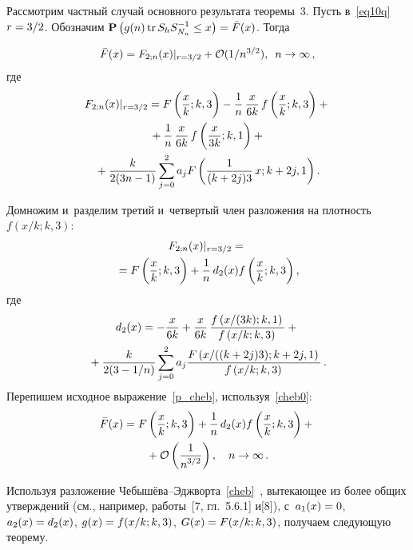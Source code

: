 \begin{multicols}{2}
Рассмотрим частный случай основного результата теоремы~3. Пусть в~\eqref{eq10q} 
$r\hm=3/2$. Обозначим $\mathbf{P}\left( g(n) \,\textrm{tr}\,S_h S^{-1}_{N_n} \leq x\right)
\hm = \bar{F}(x)$. Тогда

\noindent
\begin{equation}
\label{p_cheb}
\bar{F}(x) = F_{2; n}(x)|_{r=3/2} + \mathcal{O}(1/n^{3/2}), \enskip n \to \infty\,,
\end{equation}
где
\begin{multline*}
F_{2;n}(x) |_{r=3/2} = F\left(\displaystyle\frac{\displaystyle x\mathstrut}{\displaystyle k\mathstrut};k,3\right) - 
\displaystyle\frac{\displaystyle 1\mathstrut}{\displaystyle n\mathstrut}\,\displaystyle\frac{\displaystyle x\mathstrut}{\displaystyle 6k\mathstrut} \,f\left(\displaystyle\frac{\displaystyle x\mathstrut}{\displaystyle k\mathstrut};k,3\right) + {}\\
{} +\displaystyle\frac{\displaystyle 1\mathstrut}{\displaystyle n\mathstrut}\,\displaystyle\frac{\displaystyle x\mathstrut}{\displaystyle 6k\mathstrut} \,f\left( \displaystyle\frac{\displaystyle x\mathstrut}{\displaystyle 3k\mathstrut};k,1\right) + {}\\
{}+\displaystyle\frac{\displaystyle k\mathstrut}{\displaystyle 2(3n-1)\mathstrut} 
\sum\limits_{j=0}^{2} a_j  F\left( \displaystyle\frac{\displaystyle 1\mathstrut}{\displaystyle (k+2j)3\mathstrut}\,x;k+2j,1\right).  
\end{multline*}

Домножим и~разделим третий и~четвертый член разложения на плот\-ность 
$f\left({x}/{k};k,3\right)$:
\begin{multline}
\label{cheb0}
F_{2;n}(x) |_{r=3/2} ={}\\
{}= F\left(\fr{x}{k};k,3\right) + \fr{1}{n}\,d_2(x) 
f\left(\fr{x}{k};k,3\right),
\end{multline}
где
\begin{multline*}
d_2(x) = - \displaystyle\frac{\displaystyle x\mathstrut}{\displaystyle 6k\mathstrut} + \displaystyle\frac{\displaystyle x\mathstrut}{\displaystyle 6k\mathstrut} \,\displaystyle\frac{\displaystyle f\left(  {x}/{(3k)};k,1\right)\mathstrut}{\displaystyle f\left({x}/{k};k,3\right)\mathstrut} + {}\\
{}+
\displaystyle\frac{\displaystyle k\mathstrut}{\displaystyle 2(3-1/n)\mathstrut} 
\sum\limits_{j=0}^{2} a_j  \displaystyle\frac{\displaystyle F\left( {x}/({(k+2j)3});k+2j,1\right)\mathstrut}{\displaystyle f\left({x}/{k};k,3\right)\mathstrut}\,.
\end{multline*}
Перепишем исходное выражение~\eqref{p_cheb}, используя~\eqref{cheb0}:
\begin{multline}
\label{cheb}
\bar{F}(x) = F\left(\fr{x}{k};k,3\right) + \fr{1}{n}\,d_2(x) 
f\left(\fr{x}{k};k,3\right) + {}\\
{}+\mathcal{O}\left(\fr{1}{n^{3/2}}\right), \quad
n \to \infty\,.
\end{multline}

Используя разложение Че\-бы\-шё\-ва--Эдж\-вор\-та~\eqref{cheb}~\cite[утверждение 2]{CMU}, 
вытекающее из более общих утверждений (см., например, работы~[7, гл.~5.6.1] и[8]), 
с~$a_1(x)\hm=0$, $a_2(x)\hm=d_2(x)$, 
$g(x)\hm=f({x}/{k};k,3)$, $G(x)\hm=F({x}/{k};k,3)$, получаем следующую тео\-ре\-му.

\smallskip


\end{multicols}
